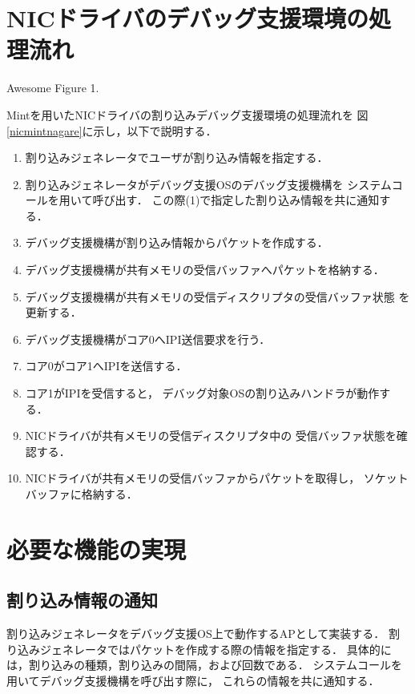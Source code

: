 \documentclass[tanilab-enum]{graduate}
\begin{document}
\section{NICドライバのデバッグ支援環境の処理流れ}
{Awesome Figure 1.}

Mintを用いたNICドライバの割り込みデバッグ支援環境の処理流れを
図\ref{nicmintnagare}に示し，以下で説明する．
\begin{enumerate}
    \item
        割り込みジェネレータでユーザが割り込み情報を指定する．
    \item 
        割り込みジェネレータがデバッグ支援OSのデバッグ支援機構を
        システムコールを用いて呼び出す．
        この際(1)で指定した割り込み情報を共に通知する．
    \item 
        デバッグ支援機構が割り込み情報からパケットを作成する．
    \item 
        デバッグ支援機構が共有メモリの受信バッファへパケットを格納する．
    \item 
        デバッグ支援機構が共有メモリの受信ディスクリプタの受信バッファ状態
        を更新する．
    \item
        デバッグ支援機構がコア0へIPI送信要求を行う．
    \item
        コア0がコア1へIPIを送信する．
    \item 
        コア1がIPIを受信すると，
        デバッグ対象OSの割り込みハンドラが動作する．
    \item 
        NICドライバが共有メモリの受信ディスクリプタ中の
        受信バッファ状態を確認する．
    \item 
        NICドライバが共有メモリの受信バッファからパケットを取得し，
        ソケットバッファに格納する．
\end{enumerate}

\section{必要な機能の実現}

\subsection{割り込み情報の通知}
割り込みジェネレータをデバッグ支援OS上で動作するAPとして実装する．
割り込みジェネレータではパケットを作成する際の情報を指定する．
具体的には，割り込みの種類，割り込みの間隔，および回数である．
システムコールを用いてデバッグ支援機構を呼び出す際に，
これらの情報を共に通知する．
\end{document}
